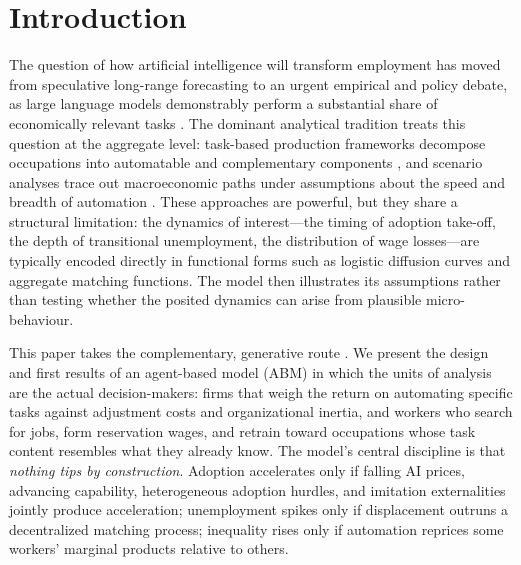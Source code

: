 \documentclass[11pt,a4paper]{article}
\begin{document}
\section{Introduction}

The question of how artificial intelligence will transform employment has moved from
speculative long-range forecasting \citep{frey2017future} to an urgent empirical and
policy debate, as large language models demonstrably perform a substantial share of
economically relevant tasks \citep{eloundou2024gpts, noy2023experimental,
brynjolfsson2025generative}. The dominant analytical tradition treats this question at
the aggregate level: task-based production frameworks decompose occupations into
automatable and complementary components \citep{autor2003skill, acemoglu2018race,
acemoglu2019automation}, and scenario analyses trace out macroeconomic paths under
assumptions about the speed and breadth of automation \citep{korinek2024scenarios,
korinek2024policy}. These approaches are powerful, but they share a structural
limitation: the dynamics of interest---the timing of adoption take-off, the depth of
transitional unemployment, the distribution of wage losses---are typically encoded
directly in functional forms such as logistic diffusion curves and aggregate matching
functions. The model then illustrates its assumptions rather than testing whether the
posited dynamics can arise from plausible micro-behaviour.

This paper takes the complementary, generative route \citep{epstein1996growing,
tesfatsion2006ace}. We present the design and first results of an agent-based model
(ABM) in which the units of analysis are the actual decision-makers: firms that weigh
the return on automating specific tasks against adjustment costs and organizational
inertia, and workers who search for jobs, form reservation wages, and retrain toward
occupations whose task content resembles what they already know. The model's central
discipline is that \emph{nothing tips by construction}. Adoption accelerates only if
falling AI prices, advancing capability, heterogeneous adoption hurdles, and imitation
externalities jointly produce acceleration; unemployment spikes only if displacement
outruns a decentralized matching process; inequality rises only if automation reprices
some workers' marginal products relative to others.
\end{document}
